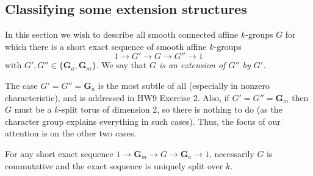 \documentclass[10pt]{article}
\renewcommand{\(}{\left(}
\renewcommand{\)}{\right)}
\numberwithin{thm}{subsection}
\begin{document}
\subsection{Classifying  some extension structures}\label{sec2}

In this section we wish to describe all smooth connected affine $k$-groups $G$ for which there
is a short exact sequence of smooth affine $k$-groups
$$1 \rightarrow G' \rightarrow G \rightarrow G'' \rightarrow 1$$
with $G', G'' \in \{\mathbf{G}_a, \mathbf{G}_m\}$. 
We say that {\em $G$ is an extension of $G''$ by $G'$}. 

The case $G' = G'' = \mathbf{G}_a$ is the most subtle of all (especially in nonzero
characteristic), and is addressed in HW9 Exercise 2.  Also, if $G' = G'' = \mathbf{G}_m$
then $G$ must be a $k$-split torus of dimension 2, so there is nothing to do
(as the character group explains everything in such cases).
Thus, the focus of our attention is on the other two cases.

\begin{proposition}\label{gagm} For any short exact sequence 
$1 \rightarrow \mathbf{G}_m \rightarrow G \rightarrow \mathbf{G}_a \rightarrow 1$,
necessarily $G$ is commutative and the exact sequence is uniquely split over $k$.
\end{proposition}
\end{document}
